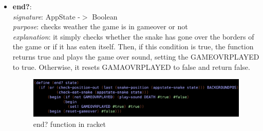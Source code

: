 \documentclass{article}
\begin{document}
\begin{itemize}
		\item \textbf{end?}: \\
			\emph{signature}: AppState -$>$ Boolean \\
			\emph{purpose}: checks weather the game is in gameover or not \\
			\emph{explanation}: it simply checks whether the snake has gone over the borders of the game or if it has eaten itself. Then, if this condition is true, the function returns true and plays the game over sound, setting the GAMEOVRPLAYED to true. Otherwise, it resets GAMAOVRPLAYED to false and return false.
			\begin{figure}[h!]
				\centering
				\includegraphics[width=.6\linewidth]{end?.png}
				\caption{end? function in racket}
			\end{figure}
	\end{itemize}
\end{document}

